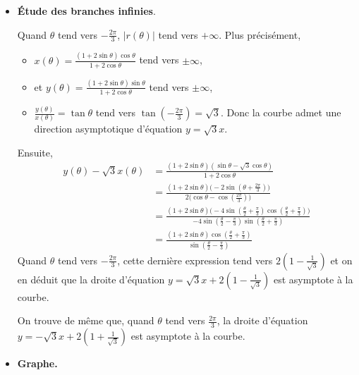 \documentclass[class=report,crop=false]{standalone}
\begin{document}
\begin{exemple}
\begin{itemize}
  \item \textbf{Étude des branches infinies}.

  Quand $\theta$ tend vers $-\frac{2\pi}{3}$, $|r(\theta)|$ tend vers $+\infty$. Plus précisément,
  \begin{itemize}
    \item $x(\theta)=\frac{(1+2\sin\theta)\cos\theta}{1+2\cos\theta}$
tend vers $\pm\infty$,

    \item et $y(\theta)=\frac{(1+2\sin\theta)\sin\theta}{1+2\cos\theta}$
tend vers $\pm\infty$,

    \item $\frac{y(\theta)}{x(\theta)}=\tan\theta$ tend vers $\tan(-\frac{2\pi}{3})=\sqrt{3}$.
Donc la courbe admet une direction asymptotique d'équation $y=\sqrt{3}x$.
  \end{itemize}


Ensuite,
\begin{align*}
y(\theta)-\sqrt{3} x(\theta)
&=\frac{(1+2\sin\theta)(\sin\theta-\sqrt{3}\cos\theta)}{1+2\cos\theta}\\
&=\frac{(1+2\sin\theta)\big(-2\sin(\theta+\frac{2\pi}{3})\big)}{2\big(\cos\theta-\cos(\frac{2\pi}{3})\big)}\\
&=\frac{(1+2\sin\theta)\big(-4\sin(\frac{\theta}{2}+\frac{\pi}{3})\cos(\frac{\theta}{2}+\frac{\pi}{3})\big)}
 {-4\sin(\frac{\theta}{2}-\frac{\pi}{3})\sin(\frac{\theta}{2}+\frac{\pi}{3})}\\
&=\frac{(1+2\sin\theta)\cos(\frac{\theta}{2}+\frac{\pi}{3})}
 {\sin(\frac{\theta}{2}-\frac{\pi}{3})}
\end{align*}
Quand $\theta$ tend vers $-\frac{2\pi}{3}$, cette dernière
expression tend vers $2(1-\frac{1}{\sqrt{3}})$ et on en déduit que la droite d'équation
$y=\sqrt{3}x+2(1-\frac{1}{\sqrt{3}})$ est asymptote à la courbe.

On trouve de même que, quand $\theta$ tend vers $\frac{2\pi}{3}$,
la droite d'équation $y=-\sqrt{3}x+2(1+\frac{1}{\sqrt{3}})$ est asymptote à la courbe.


  \item \textbf{Graphe.}

\end{itemize}


\end{exemple}
\end{document}
